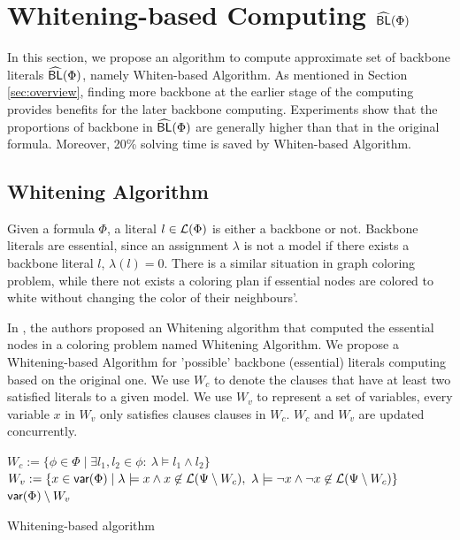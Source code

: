 \section{Whitening-based Computing ${\sf \widehat{BL}}(\Phi)$}

In this section, we propose an algorithm to compute approximate set of backbone literals ${\sf \widehat{BL}}(\Phi)$, namely Whiten-based Algorithm. As mentioned in Section \ref{sec:overview}, finding more backbone at the earlier stage of the computing provides benefits for the later backbone computing. Experiments show that the proportions of backbone in ${\sf \widehat{BL}}(\Phi)$ are generally higher than that in the original formula. Moreover, 20\% solving time is saved by Whiten-based Algorithm.

\subsection{Whitening Algorithm}

Given a formula $\Phi$, a literal $l\in\Lit(\Phi)$ is either a backbone or not. Backbone literals are essential, since an assignment $\lambda$ is not a model if there exists a backbone literal $l$, $\lambda(l)=0$. There is a similar situation in graph coloring problem, while there not exists a coloring plan if essential nodes are colored to white without changing the color of their neighbours'.

In \cite{Par03}, the authors proposed an Whitening algorithm that computed the essential nodes in a coloring problem named Whitening Algorithm. We propose a Whitening-based Algorithm for 'possible' backbone (essential) literals computing based on the original one. We use $W_c$ to denote the clauses that have at least two satisfied literals to a given model. We use $W_v$ to represent a set of variables, every variable $x$ in $W_v$ only satisfies clauses clauses in $W_c$. $W_c$ and $W_v$ are updated concurrently.

\begin{algorithm2e}
\SetAlgoShortEnd
\SetFillComment
{}
$W_c:= \{\phi\in\Phi \mid \exists l_1,l_2\in\phi: \  \lambda\models l_1\wedge l_2\}$\; \label{alg2:c}
$W_v:=\{x\in \var(\Phi)\mid \lambda\models x\wedge x\not\in \Lit(\Psi\setminus W_c),
        \ \lambda\models \neg x\wedge \neg x\not\in \Lit(\Psi\setminus W_c)\}$\; \label{alg2:v}
\Return $\textsf{var}(\Phi)\setminus W_v$\;
\caption{Whitening-based algorithm}
\label{alg:whitening}
\end{algorithm2e}

